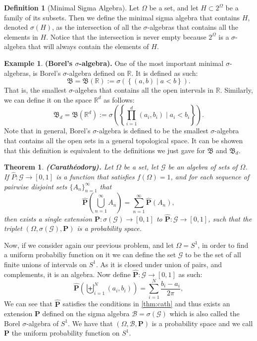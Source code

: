 \documentclass[11pt,a4paper]{article}
\theoremstyle{definition}
\newtheorem{definition}{Definition}[section]
\newtheorem{example}{Example}[section]
\theoremstyle{plain}
\newtheorem{theorem}{Theorem}[section]
\newcommand{\R}{\mathbb{R}}
\newcommand{\set}[2]{ \left\{ #1 \mid #2 \right\} }
\renewcommand{\tt}[1]{\textnormal{\textbf{(#1).}}} %
\begin{document}
  \begin{definition}[Minimal Sigma Algebra]
    Let $\Omega$ be a set, and let $H \subset 2^\Omega$ be a family of its
    subsets. Then we define the minimal sigma algebra that contains $H$,
    denoted $\sigma(H)$, as the intersection of all the $\sigma$-algebras
    that contains all the elements in $H$. Notice that the intersection is
    never empty because $2^\Omega$ is a $\sigma$-algebra that will always
    contain the elements of $H$.
  \end{definition}

  \begin{example}
    \tt{Borel's $\sigma$-algebra}
    One of the most important minimal $\sigma$-algebras, is Borel's 
    $\sigma$-algebra defined on $\R$. It is defined as such:
    \[
      \mathfrak B = \mathfrak B(\R) := \sigma(\set{(a,b)}{a < b}).
    \]
    That is, the smallest $\sigma$-algebra that contains all the open 
    intervals in $\R$. Similarly, we can define it on the space $\R^d$
    as follows:
    \[
      \mathfrak B_d = \mathfrak B(\R^d) := 
      \sigma\left(\set{\prod_{i=1}^{d}(a_i,b_i)}{a_i < b_i}\right).
    \]
    Note that in general, Borel's $\sigma$-algebra is defined to be
    the smallest $\sigma$-algebra that contains all the open sets in a
    general topological space. It can be showen that this definition is
    equivalent to the definitions we just gave for $\mathfrak B$ and
    $\mathfrak B_d$.
  \end{example}

  \begin{theorem}\label{thm:cath}
    \tt{Carath\'eodory}
    Let $\Omega$ be a set, let $\mathcal G$ be an algebra of sets of $\Omega$.
    If $\widehat{P} \colon \mathcal G \to [0,1]$ is a function that satisfies
    $f(\Omega) = 1$, and for each sequence of pairwise disjoint sets
    $\{A_n\}_{n=1}^{\infty}$ that
      \[
        \widehat{\mathbf P} \left(\bigcup_{n=1}^{\infty}{A_n}\right) = 
        \sum_{n=1}^{\infty}{\widehat{\mathbf P}(A_n)},
      \]
    then exists a single extension 
    $\mathbf P \colon \sigma(\mathcal G) \to [0,1]$ to 
    $\widehat{\mathbf P} \colon \mathcal G \to [0,1]$, such that the triplet
    $(\Omega, \sigma(\mathcal G), \mathbf P)$ is a probability space.
  \end{theorem}

  Now, if we consider again our previous problem, and let $\Omega = S^1$,
  in order to find a uniform probabiliy function on it we can define the
  set $\mathcal G$ to be the set of all finite unions of intervals on $S^1$.
  As it is closed under union of pairs, and complements, it is an algebra.
  Now define $\widehat{\mathbf P} \colon \mathcal G \to [0,1]$ as such:
  \[
    \widehat{\mathbf{P}}\left(\biguplus_{i=1}^{N}\left(a_{i},b_{i}\right)\right)
    = \sum_{i=1}^{N}\frac{b_{i}-a_{i}}{2\pi},
  \]
  We can see that $\widehat{\mathbf P}$ satisfies the conditions in 
  \autoref{thm:cath} and thus exists an extension $\mathbf P$ defined on
  the sigma algebra $\mathcal B = \sigma(\mathcal G)$ which is also called
  the Borel $\sigma$-algebra of $S^1$. We have that 
  $(\Omega, \mathcal B, \mathbf P)$ is a probability space and we call 
  $\mathbf P$ the uniform probability function on $S^1$.
\end{document}
